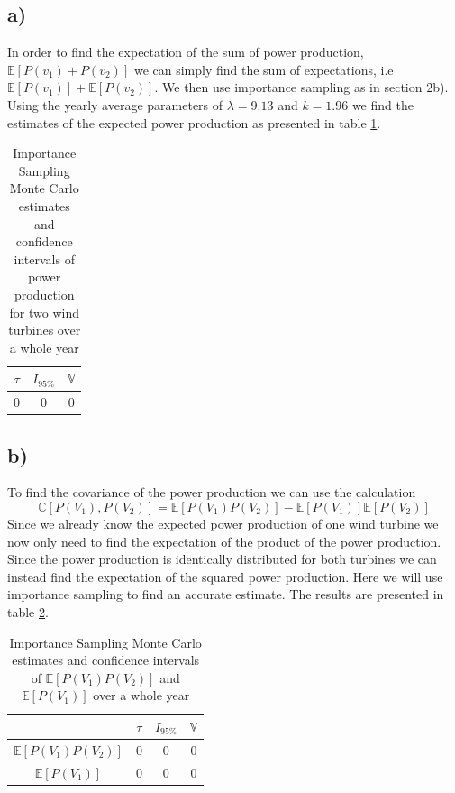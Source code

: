 \documentclass[a4paper]{article}
\begin{document}
\subsection*{a)}
In order to find the expectation of the sum of power production, $\mathbb{E}[P(v_1) + P(v_2)]$ we can simply find the sum of expectations, i.e $\mathbb{E}[P(v_1)] + \mathbb{E}[P(v_2)]$. We then use importance sampling as in section 2b). Using the yearly average parameters of $\lambda = 9.13$ and $k = 1.96$ we find the estimates of the expected power production as presented in table \ref{tab:IS2results}.


\begin{table}[H]
    \centering
    \caption{Importance Sampling Monte Carlo estimates and confidence intervals of power production for two wind turbines over a whole year}
    \label{tab:IS2results}
    \begin{tabular}{| c c c ||}
        \hline
        $\tau$ & $I_{95\%}$ & $\mathbb{V}$ \\
        \hline\hline
        0 & 0 & 0 \\
        \hline
    \end{tabular}
\end{table}

\subsection*{b)}
To find the covariance of the power production we can use the calculation
\begin{equation}
     \mathbb{C}[P(V_1), P(V_2)] = \mathbb{E}[P(V_1)P(V_2)] - \mathbb{E}[P(V_1)]\mathbb{E}[P(V_2)]
\end{equation}
Since we already know the expected power production of one wind turbine we now only need to find the expectation of the product of the power production. Since the power production is identically distributed for both turbines we can instead find the expectation of the squared power production. Here we will use importance sampling to find an accurate estimate. The results are presented in table \ref{tab:Covresults}.

\begin{table}[H]
    \centering
    \caption{Importance Sampling Monte Carlo estimates and confidence intervals of $\mathbb{E}[P(V_1)P(V_2)]$ and $\mathbb{E}[P(V_1)]$ over a whole year}
    \label{tab:Covresults}
    \begin{tabular}{|c|| c c c ||}
        \hline
        & $\tau$ & $I_{95\%}$ & $\mathbb{V}$ \\
        \hline\hline
        $\mathbb{E}[P(V_1)P(V_2)]$ & 0 & 0 & 0 \\
        \hline
        $\mathbb{E}[P(V_1)]$ & 0 & 0 & 0 \\
        \hline
    \end{tabular}
\end{table}
\end{document}
